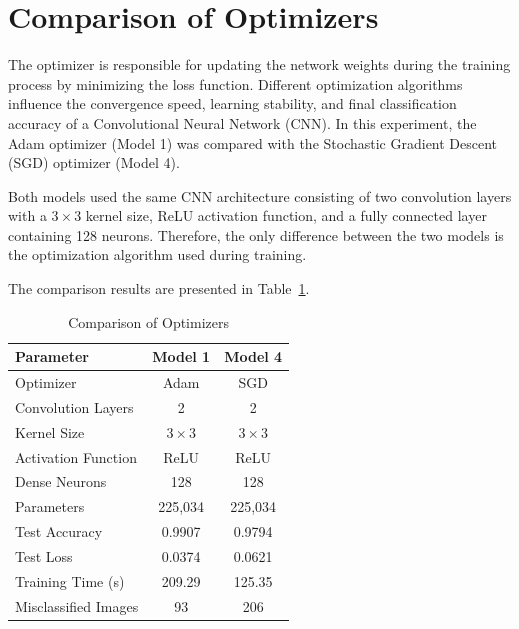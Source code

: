 
\section{Comparison of Optimizers}

The optimizer is responsible for updating the network weights during the training process by minimizing the loss function. Different optimization algorithms influence the convergence speed, learning stability, and final classification accuracy of a Convolutional Neural Network (CNN). In this experiment, the Adam optimizer (Model 1) was compared with the Stochastic Gradient Descent (SGD) optimizer (Model 4).

Both models used the same CNN architecture consisting of two convolution layers with a $3\times3$ kernel size, ReLU activation function, and a fully connected layer containing 128 neurons. Therefore, the only difference between the two models is the optimization algorithm used during training.

The comparison results are presented in Table~\ref{tab:optimizercomparison}.

\begin{table}[H]
\centering
\caption{Comparison of Optimizers}\label{tab:optimizercomparison}

\begin{tabular}{lcc}
\toprule
\textbf{Parameter} & \textbf{Model 1} & \textbf{Model 4} \\
\midrule
Optimizer & Adam & SGD\\
Convolution Layers & 2 & 2\\
Kernel Size & $3\times3$ & $3\times3$\\
Activation Function & ReLU & ReLU\\
Dense Neurons & 128 & 128\\
Parameters & 225,034 & 225,034\\
Test Accuracy & 0.9907 & 0.9794\\
Test Loss & 0.0374 & 0.0621\\
Training Time (s) & 209.29 & 125.35\\
Misclassified Images & 93 & 206\\
\bottomrule
\end{tabular}

\end{table}

